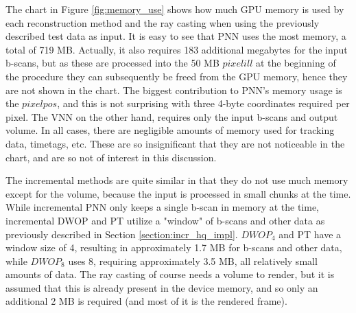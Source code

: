 	The chart in Figure \ref{fig:memory_use} shows how much GPU memory is used by each reconstruction method and the ray casting when using the previously described test data as input. It is easy to see that PNN uses the most memory, a total of 719 MB. Actually, it also requires 183 additional megabytes for the input b-scans, but as these are processed into the 50 MB $pixelill$ at the beginning of the procedure they can subsequently be freed from the GPU memory, hence they are not shown in the chart. The biggest contribution to PNN's memory usage is the $pixelpos$, and this is not surprising with three 4-byte coordinates required per pixel. The VNN on the other hand, requires only the input b-scans and output volume. In all cases, there are negligible amounts of memory used for tracking data, timetags, etc. These are so insignificant that they are not noticeable in the chart, and are so not of interest in this discussion.
	
	The incremental methods are quite similar in that they do not use much memory except for the volume, because the input is processed in small chunks at the time. While incremental PNN only keeps a single b-scan in memory at the time, incremental DWOP and PT utilize a "window" of b-scans and other data as previously described in Section \ref{section:incr_hq_impl}. $DWOP_4$ and PT have a window size of 4, resulting in approximately 1.7 MB for b-scans and other data, while $DWOP_8$ uses 8, requiring approximately 3.5 MB, all relatively small amounts of data. The ray casting of course needs a volume to render, but it is assumed that this is already present in the device memory, and so only an additional 2 MB is required (and most of it is the rendered frame).

